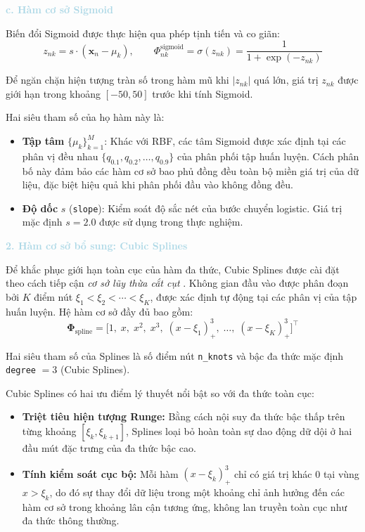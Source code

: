 \noindent\textcolor{lightblue}{\textbf{c. Hàm cơ sở Sigmoid}}

Biến đổi Sigmoid được thực hiện qua phép tịnh tiến và co giãn:
$$z_{nk} = s \cdot (\boldsymbol{x}_n - \mu_k), \qquad
  \Phi_{nk}^{\mathrm{sigmoid}} = \sigma(z_{nk}) 
  = \frac{1}{1 + \exp(-z_{nk})}$$

Để ngăn chặn hiện tượng tràn số trong hàm mũ khi 
$|z_{nk}|$ quá lớn, giá trị $z_{nk}$ được giới hạn trong khoảng 
$[-50, 50]$ trước khi tính Sigmoid.

Hai siêu tham số của họ hàm này là:
\begin{itemize} [labelsep=10pt, leftmargin=2cm]
    \item \textbf{Tập tâm} $\{\mu_k\}_{k=1}^{M}$: Khác với RBF, các tâm 
    Sigmoid được xác định tại các phân vị đều nhau  
    $\{q_{0.1}, q_{0.2}, \ldots, q_{0.9}\}$ của phân phối tập huấn luyện. 
    Cách phân bố này đảm bảo các hàm cơ sở bao phủ đồng đều toàn bộ miền 
    giá trị của dữ liệu, đặc biệt hiệu quả khi phân phối đầu vào không đồng 
    đều.
    \item \textbf{Độ dốc} $s$ (\texttt{slope}): Kiểm soát độ sắc nét của 
    bước chuyển logistic. Giá trị mặc định $s = 2.0$ được sử dụng trong 
    thực nghiệm.
\end{itemize}

\noindent\textcolor{lightblue}{\textbf{2. Hàm cơ sở bổ sung: Cubic Splines}}

Để khắc phục giới hạn toàn cục của hàm đa thức, Cubic Splines được 
cài đặt theo cách tiếp cận \textit{cơ sở lũy thừa cắt cụt} 
. Không gian đầu vào được phân đoạn bởi $K$ 
điểm nút $\xi_1 < \xi_2 < \cdots < \xi_K$, được xác định tự động 
tại các phân vị của tập huấn luyện. Hệ hàm cơ sở đầy đủ bao gồm:
$$\boldsymbol{\Phi}_{\mathrm{spline}} 
  = \bigl[1,\; x,\; x^2,\; x^3,\; 
    (x-\xi_1)_+^3,\; \ldots,\; (x-\xi_K)_+^3\bigr]^{\top}$$

Hai siêu tham số của Splines là số điểm nút \texttt{n\_knots} và bậc 
đa thức mặc định \texttt{degree} $= 3$ (Cubic Splines).

Cubic Splines có hai ưu điểm lý thuyết nổi bật so với đa thức toàn cục:
\begin{itemize} [labelsep=10pt, leftmargin=2cm]
    \item \textbf{Triệt tiêu hiện tượng Runge:} Bằng cách nội suy đa thức 
    bậc thấp trên từng khoảng $[\xi_k, \xi_{k+1}]$, Splines loại bỏ 
    hoàn toàn sự dao động dữ dội ở hai đầu mút đặc trưng của đa thức 
    bậc cao.
    \item \textbf{Tính kiểm soát cục bộ:} Mỗi hàm 
    $(x - \xi_k)_+^3$ chỉ có giá trị khác 0 tại vùng $x > \xi_k$, 
    do đó sự thay đổi dữ liệu trong một khoảng chỉ ảnh hưởng đến các 
    hàm cơ sở trong khoảng lân cận tương ứng, không lan truyền toàn 
    cục như đa thức thông thường.
\end{itemize}

